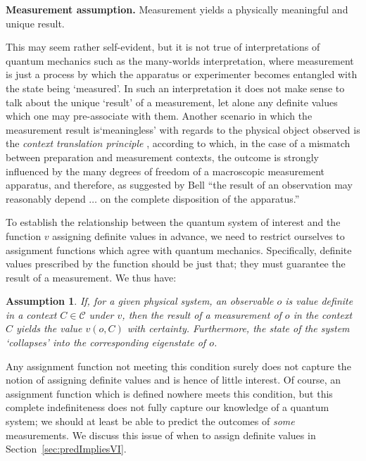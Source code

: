\documentclass[%
 preprint,
 showpacs,
 showkeys,
 amsmath,
 amssymb,
 aps,
 pra,
 ]{revtex4-1}
\newtheorem{Assumption}{Assumption}
\theoremstyle{definition}
\begin{document}
	\textbf{Measurement assumption.} Measurement yields a physically meaningful and unique result.

This may seem rather self-evident, but it is not true of interpretations of quantum mechanics such as the many-worlds interpretation, where measurement is just a process by which the apparatus or experimenter becomes entangled with the state being `measured'.
In such an interpretation it does not make sense to talk about the unique `result' of a measurement, let alone any definite values which one may pre-associate with them.
{\color{blue}
Another scenario in which the measurement result is`meaningless' with regards to the physical object observed is
the \emph{context translation principle} \cite{svozil-2003-garda}, according to which,
in the case of a mismatch between preparation and measurement contexts,
the outcome is strongly influenced by the many degrees of
freedom of a macroscopic measurement apparatus, and therefore, as suggested by Bell \cite[p.~451]{bell-66}
``the result of an observation may reasonably depend $\ldots$ on the complete disposition of the apparatus.''
}
\fi

To establish the relationship between the quantum system of interest and the function $v$ assigning definite values in advance, we need to restrict ourselves to assignment functions which agree with quantum mechanics.
Specifically, definite values prescribed by the function should be just that; they must guarantee the result of a measurement. We thus have:\\

\begin{Assumption}
If, for a given physical system, an observable $o$ is value definite in a context $C\in\mathcal{C}$ under $v$, then the result of a measurement of $o$ in the context $C$ yields the value $v(o,C)$ with certainty.
Furthermore, the state of the system `collapses' into the corresponding eigenstate of $o$.
\end{Assumption}

Any assignment function not meeting this condition surely does not capture the notion of assigning definite values and is hence of little interest.
Of course, an assignment function which is defined nowhere meets this condition, but this complete indefiniteness does not fully capture our knowledge of a quantum system; we should at least be able to predict the outcomes of \emph{some} measurements.
We discuss this issue of when to assign definite values in Section~\ref{sec:predImpliesVI}.
\fi
\end{document}
